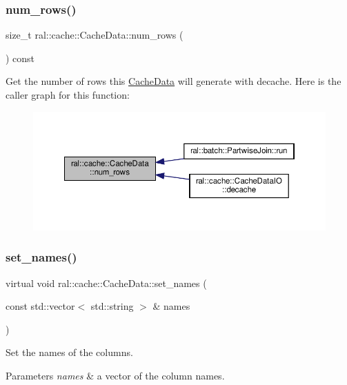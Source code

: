 \subsubsection{\texorpdfstring{num\+\_\+rows()}{num\_rows()}}
{\footnotesize\ttfamily size\+\_\+t ral\+::cache\+::\+Cache\+Data\+::num\+\_\+rows (\begin{DoxyParamCaption}{ }\end{DoxyParamCaption}) const\hspace{0.3cm}{\ttfamily [inline]}}

Get the number of rows this \hyperlink{classral_1_1cache_1_1CacheData}{Cache\+Data} will generate with decache. Here is the caller graph for this function\+:\nopagebreak
\begin{figure}[H]
\begin{center}
\leavevmode
\includegraphics[width=350pt]{classral_1_1cache_1_1CacheData_a14a5b9fadf872c12d633e38bb6f9f07d_icgraph}
\end{center}
\end{figure}
\mbox{\label{classral_1_1cache_1_1CacheData_a3bb1623a4266ba7c961d325023ff13c6}} 
\subsubsection{\texorpdfstring{set\+\_\+names()}{set\_names()}}
{\footnotesize\ttfamily virtual void ral\+::cache\+::\+Cache\+Data\+::set\+\_\+names (\begin{DoxyParamCaption}\item[{const std\+::vector$<$ std\+::string $>$ \&}]{names }\end{DoxyParamCaption})\hspace{0.3cm}{\ttfamily [pure virtual]}}

Set the names of the columns. 
\begin{DoxyParams}{Parameters}
{\em names} & a vector of the column names. \\
\hline
\end{DoxyParams}


